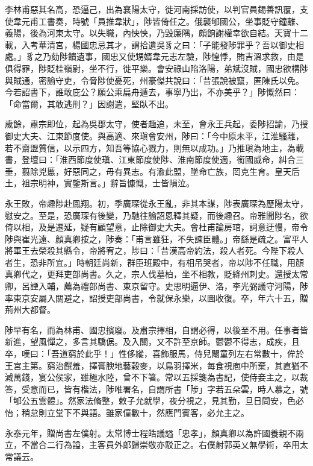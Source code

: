 \begin{pinyinscope}
 李林甫惡其名高，恐逼己，出為襄陽太守，徙河南採訪使，以判官員錫善訊覆，支使韋元甫工書奏，時號「員推韋狀」，陟皆倚任之。俄襲郇國公，坐事貶守鐘離、義陽，後為河東太守。以失職，內怏怏，乃毀廉隅，頗餉謝權幸欲自結。天寶十二載，入考華清宮，楊國忠忌其才，謂拾遺吳豸之曰：「子能發陟罪乎？吾以御史相處。」豸之乃劾陟饋遺事，國忠又使甥婿韋元志左驗，陟惶悸，賄吉溫求救，由是俱得罪，陟貶桂嶺尉，坐不行，徙平樂。會安祿山陷洛陽，弟斌沒賊，國忠欲構陟與賊通，密諭守吏，令脅陟使憂死，州豪傑共說曰：「昔張說被竄，匿陳氏以免。今若詔書下，誰敢庇公？願公乘扁舟遁去，事寧乃出，不亦美乎？」陟慨然曰：「命當爾，其敢逃刑？」因謝遣，堅臥不出。



 歲餘，肅宗即位，起為吳郡太守，使者趣追，未至，會永王兵起，委陟招諭，乃授御史大夫、江東節度使。與高適、來瑱會安州，陟曰：「今中原未平，江淮騷離，若不齋盟質信，以示四方，知吾等協心戮力，則無以成功。」乃推瑱為地主，為載書，登壇曰：「淮西節度使瑱、江東節度使陟、淮南節度使適，銜國威命，糾合三垂，翦除兇慝，好惡同之，毋有異志。有渝此盟，墜命亡族，罔克生育。皇天后土，祖宗明神，實鑒斯言。」辭旨慷慨，士皆隕泣。



 永王敗，帝趣陟赴鳳翔。初，季廣琛從永王亂，非其本謀，陟表廣琛為歷陽太守，慰安之。至是，恐廣琛有後變，乃馳往諭詔恩釋其疑，而後趣召。帝雅聞陟名，欲倚以相，及是遷延，疑有顧望意，止除御史大夫。會杜甫論房琯，詞意迂慢，帝令陟與崔光遠、顏真卿按之，陟奏：「甫言雖狂，不失諫臣體。」帝繇是疏之。富平人將軍王去榮殺其縣令，帝將宥之，陟曰：「昔漢高帝約法，殺人者死。今陛下殺人者生，恐非所宜。」時朝廷尚新，群臣班殿中，有相吊哭者，帝以陟不任職，用顏真卿代之，更拜吏部尚書。久之，宗人伐墓柏，坐不相教，貶絳州刺史。還授太常卿，呂諲入輔，薦為禮部尚書、東京留守。史思明逼伊、洛，李光弼議守河陽，陟率東京安屬入關避之，詔授吏部尚書，令就保永樂，以圖收復。卒，年六十五，贈荊州大都督。



 陟早有名，而為林甫、國忠擯廢。及肅宗擇相，自謂必得，以後至不用。任事者皆新進，望風憚之，多言其驕倨。及入關，又不許至京師。鬱鬱不得志，成疾，且卒，嘆曰：「吾道窮於此乎！」性侈縱，喜飾服馬，侍兒閹童列左右常數十，侔於王宮主第。窮治饌羞，擇膏腴地藝穀麥，以鳥羽擇米，每食視庖中所棄，其直猶不減萬錢，宴公侯家，雖極水陸，曾不下箸。常以五採箋為書記，使侍妾主之，以裁答，受意而已，皆有楷法，陟唯署名，自謂所書「陟」字若五朵雲，時人慕之，號「郇公五雲體」。然家法脩整，敕子允就學，夜分視之，見其勤，旦日問安，色必怡；稍怠則立堂下不與語。雖家僮數十，然應門賓客，必允主之。



 永泰元年，贈尚書左僕射。太常博士程皓議謚「忠孝」，顏真卿以為許國養親不兩立，不當合二行為謚，主客員外郎歸崇敬亦駁正之。右僕射郭英乂無學術，卒用太常議云。




\end{pinyinscope}
